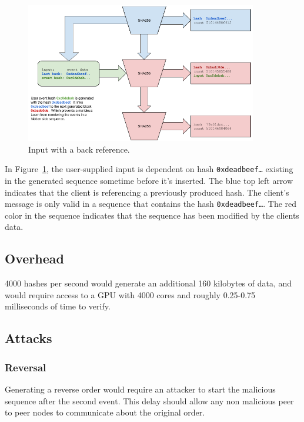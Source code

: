 \documentclass[12pt]{article}
\begin{document}
\begin{figure}
  \begin{center}
    \centering
    \includegraphics[width=0.9\textwidth]{figures/fig_6.png}
    \caption[Fig 6]{Input with a back reference.\label{fig:poh_consistency}}
  \end{center}
  \end{figure}

In Figure~\ref{fig:poh_consistency}, the user-supplied input is dependent on hash \texttt{0xdeadbeef\ldots} existing in the generated sequence sometime before it’s inserted. The blue top left arrow indicates that the client is referencing a previously produced hash. The client’s message is only valid in a sequence that contains the hash \texttt{0xdeadbeef\ldots}. The red color in the sequence indicates that the sequence has been modified by the clients data.

\subsection{Overhead}
4000 hashes per second would generate an additional 160 kilobytes of data, and would require access to a GPU with 4000 cores and roughly 0.25-0.75 milliseconds of time to verify.

\subsection{Attacks}
\subsubsection{Reversal}
 Generating a reverse order would require an attacker to start the malicious sequence after the second event. This delay should allow any non malicious peer to peer nodes to communicate about the original order.
\end{document}
